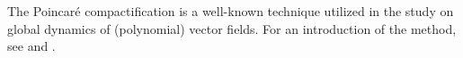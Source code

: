 \documentclass[12pt]{amsart}
\begin{document}
The Poincaré compactification is a well-known technique utilized in the study on global dynamics of (polynomial) vector fields. For an introduction of the method, see \cite[Chapter 5]{DumortierLlibreArtes} and \cite[Chapter 3]{Perko}. %



  \label{fig-compact-construc}


\end{document}
